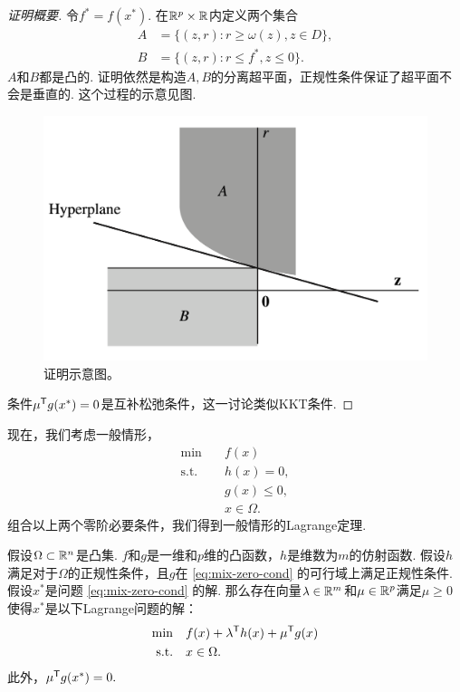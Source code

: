 \begin{proof}[证明概要]
令$f^\ast=f({x^\ast})$. 在$\mathbb{R}^{p}\times\mathbb{R}$内定义两个集合
\begin{align*}
    A&=\{(z,r):r\ge \omega(z), z\in D\},\\
    B&=\{(z,r):r\le f^\ast, z\leq 0\}.
\end{align*}
$A$和$B$都是凸的. 证明依然是构造$A,B$的分离超平面，正规性条件保证了超平面不会是垂直的. 这个过程的示意见图.
\begin{figure}
    \centering
    \includegraphics[scale=0.3]{Chapters/duality/figures/sep-hyperplane-ineq.png}
    \caption{证明示意图。}
    \label{fig:sep-hyperplane-ineq}
\end{figure}

条件$\mu^{\mathsf{T}} g(x^\ast)=0$是互补松弛条件，这一讨论类似KKT条件. 
\end{proof}

现在，我们考虑一般情形，
    \begin{equation}
          \begin{aligned}
        \min\quad & f({x}) \\
        \text{s.t.}\quad& {h(x)=0}, \\
        &g(x)\leq 0, \\
        &{x}\in\Omega.
        \end{aligned}\label{eq:mix-zero-cond}
    \end{equation}
组合以上两个零阶必要条件，我们得到一般情形的Lagrange定理.

\begin{theorem}\label{thm:mix-zero-cond}
假设$\Omega\subset \mathbb{R}^n$是凸集. $f$和${g}$是一维和$p$维的凸函数，${h}$是维数为$m$的仿射函数. 假设${h}$满足对于$\Omega$的正规性条件，且$g$在 \eqref{eq:mix-zero-cond} 的可行域上满足正规性条件. 假设${x^\ast}$是问题 \eqref{eq:mix-zero-cond} 的解. 那么存在向量${\lambda}\in \mathbb{R}^m$和${\mu}\in \mathbb{R}^p$满足${\mu}\ge {0}$使得${x^\ast}$是以下Lagrange问题的解：
\begin{align*}
\min\quad &f({x})+\lambda^{\mathsf{T}} h(x)+\mu^{\mathsf{T}} g(x) \\
\text{s.t.}\quad& x\in\Omega.
\end{align*}
此外，${\mu^{\mathsf{T}} g(x^\ast)}=0.$
\end{theorem}

